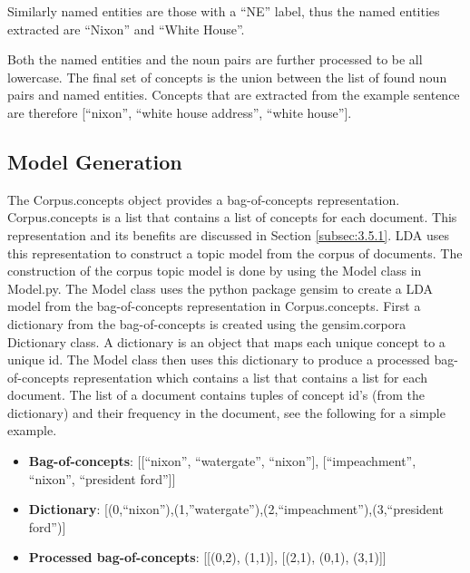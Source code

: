 Similarly named entities are those with a “NE” label, thus the named entities extracted are “Nixon” and “White House”. 

Both the named entities and the noun pairs are further processed to be all lowercase. The final set of concepts is the union between the list of found noun pairs and named entities. Concepts that are extracted from the example sentence are therefore [“nixon”, “white house address”, “white house”]. 

\subsection{Model Generation}
The Corpus.concepts object provides a bag-of-concepts representation. Corpus.concepts is a list that contains a list of concepts for each document. This representation and its benefits are discussed in Section \ref{subsec:3.5.1}. LDA uses this representation to construct a topic model from the corpus of documents. The construction of the corpus topic model is done by using the Model class in Model.py. The Model class uses the python package gensim \citep{rehurek2010software} to create a LDA model from the bag-of-concepts representation in Corpus.concepts. First a dictionary from the bag-of-concepts is created using the gensim.corpora Dictionary class. A dictionary is an object that maps each unique concept to a unique id. The Model class then uses this dictionary to produce a processed bag-of-concepts representation which contains a list that contains a list for each document. The list of a document contains tuples of concept id’s (from the dictionary) and their frequency in the document, see the following for a simple example.

\begin{itemize}
    \item \textbf{Bag-of-concepts}: [[“nixon”, “watergate”, “nixon”], [“impeachment”, “nixon”, “president ford”]]
    \item \textbf{Dictionary}: [(0,“nixon”),(1,”watergate”),(2,“impeachment”),(3,“president ford”)]
    \item \textbf{Processed bag-of-concepts}: [[(0,2), (1,1)], [(2,1), (0,1), (3,1)]]
\end{itemize}

